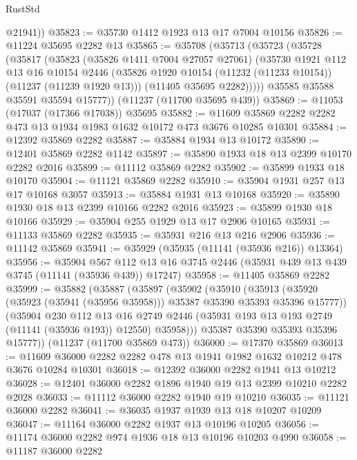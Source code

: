 \begin{lexlean}{RustStd}
\begin{coremodule}
        @21941))
@35823 := @35730 @1412 @1923 @13 @17 @7004 @10156
@35826 := @11224 @35695 @2282 @13
@35865 := @35708
    (@35713
      (@35723
        (@35728
          (@35817
            (@35823
              (@35826 @1411 @7004 @27057 @27061)
              (@35730
                @1921
                @112
                @13
                @16
                @10154
                @2446
                (@35826 @1920 @10154 (@11232 (@11233 @10154)) (@11237 (@11239 @1920 @13)))
                (@11405 @35695 @2282)))))
        @35585
        @35588
        @35591
        @35594
        @15777))
    (@11237 (@11700 @35695 @439))
@35869 := @11053 (@17037 (@17366 @17038)) @35695
@35882 := @11609 @35869 @2282 @2282 @473 @13 @1934 @1983 @1632 @10172 @473 @3676 @10285 @10301
@35884 := @12392 @35869 @2282
@35887 := @35884 @1934 @13 @10172
@35890 := @12401 @35869 @2282 @1142
@35897 := @35890 @1933 @18 @13 @2399 @10170 @2282 @2016
@35899 := @11112 @35869 @2282
@35902 := @35899 @1933 @18 @10170
@35904 := @11121 @35869 @2282
@35910 := @35904 @1931 @257 @13 @17 @10168 @3057
@35913 := @35884 @1931 @13 @10168
@35920 := @35890 @1930 @18 @13 @2399 @10166 @2282 @2016
@35923 := @35899 @1930 @18 @10166
@35929 := @35904 @255 @1929 @13 @17 @2906 @10165
@35931 := @11133 @35869 @2282
@35935 := @35931 @216 @13 @216 @2906
@35936 := @11142 @35869
@35941 := @35929 (@35935 (@11141 (@35936 @216)) @13364)
@35956 := @35904
    @567
    @112
    @13
    @16
    @3745
    @2446
    (@35931 @439 @13 @439 @3745 (@11141 (@35936 @439)) @17247)
@35958 := @11405 @35869 @2282
@35999 := @35882
    (@35887
      (@35897
        (@35902
          (@35910
            (@35913 (@35920 (@35923 (@35941 (@35956 @35958))) @35387 @35390 @35393 @35396 @15777))
            (@35904
              @230
              @112
              @13
              @16
              @2749
              @2446
              (@35931 @193 @13 @193 @2749 (@11141 (@35936 @193)) @12550)
              @35958)))
        @35387
        @35390
        @35393
        @35396
        @15777))
    (@11237 (@11700 @35869 @473))
@36000 := @17370 @35869
@36013 := @11609 @36000 @2282 @2282 @478 @13 @1941 @1982 @1632 @10212 @478 @3676 @10284 @10301
@36018 := @12392 @36000 @2282 @1941 @13 @10212
@36028 := @12401 @36000 @2282 @1896 @1940 @19 @13 @2399 @10210 @2282 @2028
@36033 := @11112 @36000 @2282 @1940 @19 @10210
@36035 := @11121 @36000 @2282
@36041 := @36035 @1937 @1939 @13 @18 @10207 @10209
@36047 := @11164 @36000 @2282 @1937 @13 @10196 @10205
@36056 := @11174 @36000 @2282 @974 @1936 @18 @13 @10196 @10203 @4990
@36058 := @11187 @36000 @2282

\end{coremodule}
\end{lexlean}
